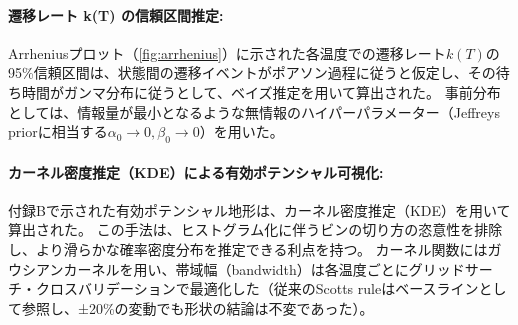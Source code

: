 \documentclass[a4paper,11pt,ja=standard,lualatex]{bxjsarticle}
\newcommand{\figref}[1]{\cref{#1}}
\begin{document}
\paragraph{遷移レート k(T) の信頼区間推定:}
Arrheniusプロット（\figref{fig:arrhenius}）に示された各温度での遷移レート$k(T)$の95\%信頼区間は、状態間の遷移イベントがポアソン過程に従うと仮定し、その待ち時間がガンマ分布に従うとして、ベイズ推定を用いて算出された。
事前分布としては、情報量が最小となるような無情報のハイパーパラメーター（Jeffreys priorに相当する$\alpha_0 \to 0, \beta_0 \to 0$）を用いた。

\paragraph{カーネル密度推定（KDE）による有効ポテンシャル可視化:}
付録Bで示された有効ポテンシャル地形は、カーネル密度推定（KDE）を用いて算出された。
この手法は、ヒストグラム化に伴うビンの切り方の恣意性を排除し、より滑らかな確率密度分布を推定できる利点を持つ。
カーネル関数にはガウシアンカーネルを用い、帯域幅（bandwidth）は各温度ごとにグリッドサーチ・クロスバリデーションで最適化した（従来のScott{\textquotesingle}s ruleはベースラインとして参照し、±20\%の変動でも形状の結論は不変であった）。

\FloatBarrier

\end{document}
